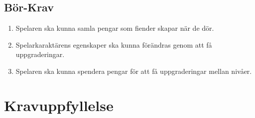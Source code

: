 \documentclass{TDP005mall}
\begin{document}
\subsection{Bör-Krav}
\begin{enumerate}
\item Spelaren ska kunna samla pengar som fiender skapar när de dör.
\item Spelarkaraktärens egenskaper ska kunna förändras genom att få uppgraderingar. 
\item Spelaren ska kunna spendera pengar för att få uppgraderingar mellan nivåer.
\end{enumerate}

\section{Kravuppfyllelse}
\end{document}
